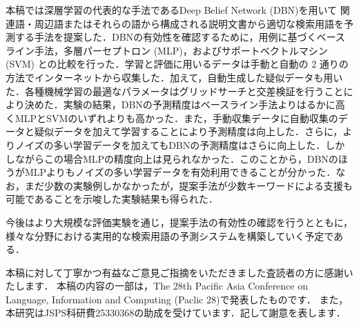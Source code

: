 \documentclass[japanese]{jnlp_1.4}
\begin{document}
本稿では深層学習の代表的な手法であるDeep Belief Network (DBN)を用いて
\pagebreak
関連語・周辺語またはそれらの語から構成される説明文書から適切な検索用語を予測する手法を提案した．DBNの有効性を確認するために，用例に基づくベースライン手法，多層パーセプトロン (MLP)，およびサポートベクトルマシン (SVM) との比較を行った．学習と評価に用いるデータは手動と自動の 2 通りの方法でインターネットから収集した．加えて，自動生成した疑似データも用いた．各種機械学習の最適なパラメータはグリッドサーチと交差検証を行うことにより決めた．実験の結果，DBNの予測精度はベースライン手法よりはるかに高くMLPとSVMのいずれよりも高かった．また，手動収集データに自動収集のデータと疑似データを加えて学習することにより予測精度は向上した．さらに，よりノイズの多い学習データを加えてもDBNの予測精度はさらに向上した．しかしながらこの場合MLPの精度向上は見られなかった．このことから，DBNのほうがMLPよりもノイズの多い学習データを有効利用できることが分かった．なお，まだ少数の実験例しかなかったが，提案手法が少数キーワードによる支援も可能であることを示唆した実験結果も得られた．

今後はより大規模な評価実験を通じ，提案手法の有効性の確認を行うとともに，様々な分野における実用的な検索用語の予測システムを構築していく予定である．


\acknowledgment

本稿に対して丁寧かつ有益なご意見ご指摘をいただきました査読者の方に感謝いたします．
本稿の内容の一部は，The 28th Pacific Asia Conference on Language, Information and Computing (Paclic 28)で発表したものです\cite{Ma:14}．
また，本研究はJSPS科研費25330368の助成を受けています．記して謝意を表します．
\end{document}
